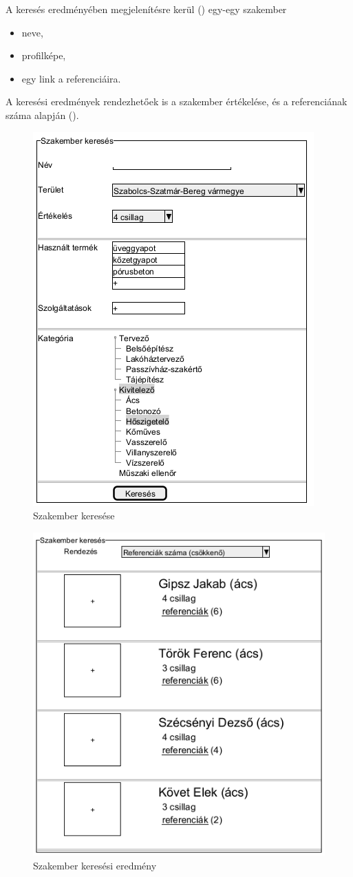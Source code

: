A keresés eredményében megjelenítésre kerül () egy-egy szakember
\begin{itemize}
     \item neve,
     \item profilképe,
     \item egy link a referenciáira.
\end{itemize}
A keresési eredmények rendezhetőek is a szakember értékelése, és a referenciának száma alapján ().

\begin{figure}[h]
	\centering
	\includegraphics[scale=0.5]{img/szakember_keres.png}
	\caption*{Szakember keresése}
	\label{fig:szak_ker}
\end{figure}

\begin{figure}[h]
	\centering
	\includegraphics[scale=0.5]{img/szakember_eredmeny.png}
	\caption*{Szakember keresési eredmény}
	\label{fig:szak_ker_ered}
\end{figure}